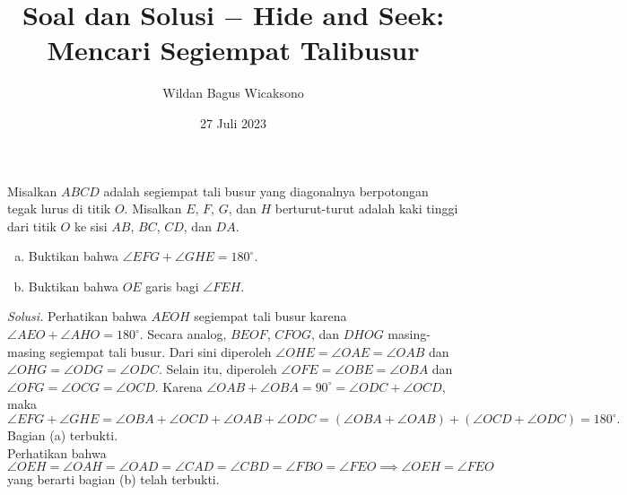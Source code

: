 \documentclass[a4paper, 11pt]{article}
\title{\textbf{Soal dan Solusi $-$ Hide and Seek: Mencari Segiempat Talibusur}}
\author{Wildan Bagus Wicaksono}
\date{27 Juli 2023}
\newcommand{\siku}[4][.21cm]
	{
	\coordinate (tempa) at ($(#3)!#1!(#2)$);
	\coordinate (tempb) at ($(#3)!#1!(#4)$);
	\coordinate (tempc) at ($(tempa)!0.5!(tempb)$);%
	\draw[black] (tempa) -- ($(#3)!2!(tempc)$) -- (tempb);
	}
\begin{document}
\maketitle
\begin{tcolorbox}[title=\textbf{Soal 1: OSN 2016/1}]
Misalkan $ABCD$ adalah segiempat tali busur yang diagonalnya berpotongan tegak lurus di titik $O$. Misalkan $E$, $F$, $G$, dan $H$ berturut-turut adalah kaki tinggi dari titik $O$ ke sisi $AB$, $BC$, $CD$, dan $DA$.
\begin{enumerate}[(a).]
\item Buktikan bahwa $\angle EFG+\angle GHE=180^\circ$.
\item Buktikan bahwa $OE$ garis bagi $\angle FEH$.
\end{enumerate}
\end{tcolorbox}
\noindent\textit{Solusi.} Perhatikan bahwa $AEOH$ segiempat tali busur karena $\angle AEO+\angle AHO=180^\circ$. Secara analog, $BEOF$, $CFOG$, dan $DHOG$ masing-masing segiempat tali busur. Dari sini diperoleh $\angle OHE =\angle OAE=\angle OAB$ dan $\angle OHG=\angle ODG=\angle ODC$. Selain itu, diperoleh $\angle OFE =\angle OBE=\angle OBA$ dan $\angle OFG=\angle OCG =\angle OCD$. Karena $\angle OAB+\angle OBA =90^\circ=\angle ODC+\angle OCD$, maka
\[\angle EFG+\angle GHE =\angle OBA + \angle OCD +\angle OAB + \angle ODC = \left (\angle OBA +\angle OAB\right )+\left (\angle OCD+\angle ODC\right )=180^\circ. \]
Bagian (a) terbukti.\\
Perhatikan bahwa
\[\angle OEH = \angle OAH = \angle OAD = \angle CAD = \angle CBD = \angle FBO = \angle FEO\implies \angle OEH = \angle FEO\]
yang berarti bagian (b) telah terbukti.
\begin{center}
\end{center}
\end{document}
